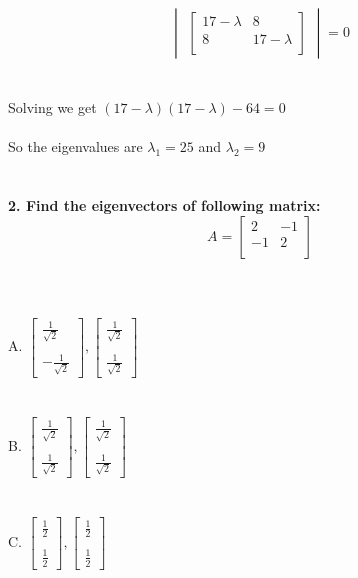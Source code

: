 \documentclass[prl,twocolumn,showpacs,preprintnumbers,superscriptaddress]{revtex4}
\theoremstyle{plain}
\theoremstyle{definition}
\begin{document}
\begin{widetext}
{\[
\begin{vmatrix}   \begin{bmatrix}    17 - \lambda & 8  \\     8 & 17 - \lambda  \\ \end{bmatrix}\end{vmatrix} = 0
\]
\\
\\
Solving we get $(17 - \lambda)(17 - \lambda) - 64 = 0$
\\
\\
So the eigenvalues are $\lambda_{1} = 25$ and $\lambda_{2} = 9$
\\
\\
\\
\textbf{2. Find the eigenvectors of following matrix:}
{\Large\[
A = \begin{bmatrix}    2 & -1 \\     -1 & 2   \\ \end{bmatrix}
\]}
\\
\\
\\
A. {\Large $\begin{bmatrix}   \frac{1}{\sqrt{2}}  \\ \\ -\frac{1}{\sqrt{2}} \end{bmatrix} , \begin{bmatrix} \frac{1}{\sqrt{2}} \\ \\ \frac{1}{\sqrt{2}} \end{bmatrix}$ }\\
\\
\\
B. {\Large $\begin{bmatrix}   \frac{1}{\sqrt{2}}  \\ \\ \frac{1}{\sqrt{2}} \end{bmatrix} , \begin{bmatrix} \frac{1}{\sqrt{2}} \\ \\ \frac{1}{\sqrt{2}} \end{bmatrix}$ }\\
\\
\\
C. {\Large $\begin{bmatrix}   \frac{1}{2}  \\  \\ \frac{1}{2} \end{bmatrix} , \begin{bmatrix} \frac{1}{2} \\ \\  \frac{1}{2} \end{bmatrix}$ }\\
}
\end{widetext}
\end{document}
